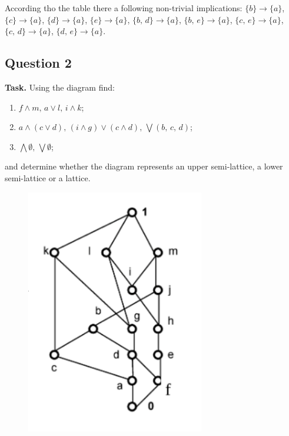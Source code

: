 \documentclass[14pt,a4paper]{extarticle}
\begin{document}
	According tho the table there a following non-trivial implications: $\{b\}\rightarrow \{a\}$, $\{c\}\rightarrow \{a\}$, $\{d\}\rightarrow \{a\}$, $\{e\}\rightarrow \{a\}$, $\{b,\, d\}\rightarrow \{a\}$, $\{b,\, e\}\rightarrow \{a\}$, $\{c,\, e\}\rightarrow \{a\}$, $\{c,\, d\}\rightarrow \{a\}$, $\{d,\, e\}\rightarrow \{a\}$.
	\newpage
	 
	\subsection*{Question 2}
	 
	\noindent\textbf{Task.} Using the diagram find:
	\begin{enumerate}
		\item $f\land m,\, a\lor l,\, i\land k$;
		\item $a\land(c\lor d),\, (i\land g)\lor(c\land d),\, \bigvee(b,\, c,\, d)$;
		\item $\bigwedge \emptyset,\, \bigvee \emptyset$;
	\end{enumerate}
	and determine whether the diagram represents an upper semi-lattice, a lower semi-lattice or a lattice.
	 
	\begin{figure}[h]
		\includegraphics[scale=1.0]{media/task2.png}
		\centering
	\end{figure}
	 
\end{document}
